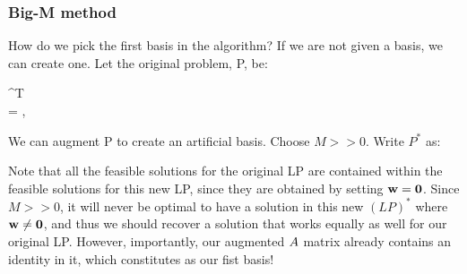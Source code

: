 \subsubsection{Big-M method}

How do we pick the first basis in the algorithm?
If we are not given a basis, we can create one.
Let the original problem, P, be:
\begin{frml}
	\min \vc^T\vx \\
	\st \vA\vx = \vb, \vx \geq \vzero
\end{frml}
We can augment P to create an artificial basis. 
Choose $M >> 0$. Write $P^*$ as:

Note that all the feasible solutions for the original LP are contained within
the feasible solutions for this new LP, since they are obtained by setting
$\mathbf{w} = \mathbf{0}$. Since $M >> 0$, it will never be optimal to have a solution in
this new $(LP)^*$ where $\mathbf{w} \neq \mathbf{0}$, and thus we should recover a solution
that works equally as well for our original LP.
However, importantly, our augmented $A$ matrix already contains an identity
in it, which constitutes as our fist basis!
